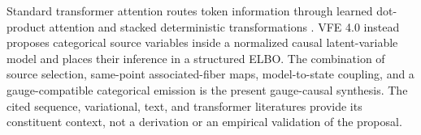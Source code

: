 Standard transformer attention routes token information through learned dot-product attention and stacked deterministic transformations \citep{Vaswani2017}. VFE 4.0 instead proposes categorical source variables inside a normalized causal latent-variable model and places their inference in a structured ELBO. The combination of source selection, same-point associated-fiber maps, model-to-state coupling, and a gauge-compatible categorical emission is the present gauge-causal synthesis. The cited sequence, variational, text, and transformer literatures provide its constituent context, not a derivation or an empirical validation of the proposal.
